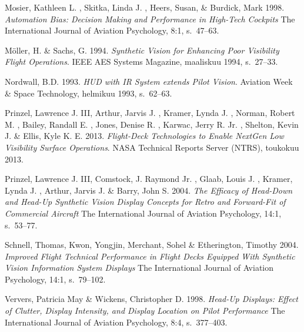 \documentclass[utf8,bachelor,manualbib]{gradu3}
\begin{document}
\begin{thebibliography}{}
Mosier, Kathleen L. , Skitka, Linda J. , Heers, Susan, \& Burdick, Mark 1998.
\textit{Automation Bias: Decision Making and Performance in High-Tech Cockpits}
The International Journal of Aviation Psychology, 8:1, s.~47--63.

Möller, H. \& Sachs, G. 1994.
\textit{Synthetic Vision for Enhancing Poor Visibility Flight Operations}.
IEEE AES Systems Magazine, maaliskuu 1994, s.~27--33.

Nordwall, B.D. 1993.
\textit{HUD with IR System extends Pilot Vision}.
Aviation Week \& Space Technology, helmikuu 1993, s.~62--63.

Prinzel, Lawrence J. III, Arthur, Jarvis J. , Kramer, Lynda J. ,  Norman, Robert M. , Bailey, Randall E. , Jones, Denise R. ,  Karwac, Jerry R. Jr. , Shelton, Kevin J. \& Ellis, Kyle K. E. 2013.
\textit{Flight-Deck Technologies to Enable NextGen Low Visibility Surface Operations}.
NASA Technical Reports Server (NTRS), toukokuu 2013.

Prinzel, Lawrence J. III, Comstock, J. Raymond Jr. , Glaab, Louis J. , Kramer, Lynda J. , Arthur, Jarvis J. \& Barry, John S. 2004.
\textit{The Efficacy of Head-Down and Head-Up Synthetic Vision Display Concepts for Retro and Forward-Fit of Commercial Aircraft}
The International Journal of Aviation Psychology, 14:1, s.~53--77.

Schnell, Thomas,  Kwon, Yongjin, Merchant, Sohel \& Etherington, Timothy 2004.
\textit{Improved Flight Technical Performance in Flight Decks Equipped With Synthetic Vision Information System Displays}
The International Journal of Aviation Psychology, 14:1, s.~79--102.

Ververs, Patricia May \& Wickens, Christopher D. 1998.
\textit{Head-Up Displays: Effect of Clutter, Display Intensity, and Display Location on Pilot Performance}
The International Journal of Aviation Psychology, 8:4, s.~377--403.


\end{thebibliography}
\end{document}
